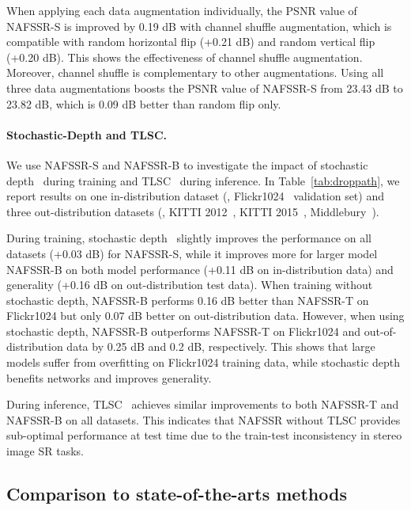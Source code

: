 \documentclass[10pt,twocolumn,letterpaper]{article}
\begin{document}
When applying each data augmentation individually, the PSNR value of NAFSSR-S is improved by 0.19 dB with channel shuffle augmentation, which is compatible with random horizontal flip (+0.21 dB) and random vertical flip (+0.20 dB). This shows the effectiveness of channel shuffle augmentation. Moreover, channel shuffle is complementary to other augmentations. Using all three data augmentations boosts the PSNR value of NAFSSR-S from 23.43 dB to 23.82 dB, which is 0.09 dB better than random flip only.

\vspace{-3mm}
\paragraph{Stochastic-Depth and TLSC.}
We use NAFSSR-S and NAFSSR-B to investigate the impact of stochastic depth~\cite{huang2016deep} during training and TLSC~\cite{chu2021tlsc} during inference.
In Table~\ref{tab:droppath}, we report results on one in-distribution dataset (\ie, Flickr1024~\cite{wang2019learning} validation set) and three out-distribution datasets (\ie, 
KITTI 2012~\cite{geiger2012we}, KITTI 2015~\cite{menze2015object}, Middlebury~\cite{scharstein2014high}).

During training, stochastic depth~\cite{huang2016deep} slightly improves the performance on all datasets (+0.03 dB) for NAFSSR-S, while it improves more for larger model NAFSSR-B on both model performance (+0.11 dB on in-distribution data) and generality (+0.16 dB on out-distribution test data). 
When training without stochastic depth, NAFSSR-B performs 0.16 dB better than NAFSSR-T on Flickr1024 but only 0.07 dB better on out-distribution data. However, when using stochastic depth, NAFSSR-B outperforms NAFSSR-T on Flickr1024 and out-of-distribution data by 0.25 dB and 0.2 dB, respectively.
This shows that large models suffer from overfitting on Flickr1024 training data, while stochastic depth benefits networks and improves generality. 

During inference, TLSC~\cite{chu2021tlsc} achieves similar improvements to both NAFSSR-T and NAFSSR-B on all datasets. This indicates that NAFSSR without TLSC provides sub-optimal performance at test time due to the train-test inconsistency in stereo image SR tasks.

\subsection{Comparison to state-of-the-arts methods}
\end{document}

